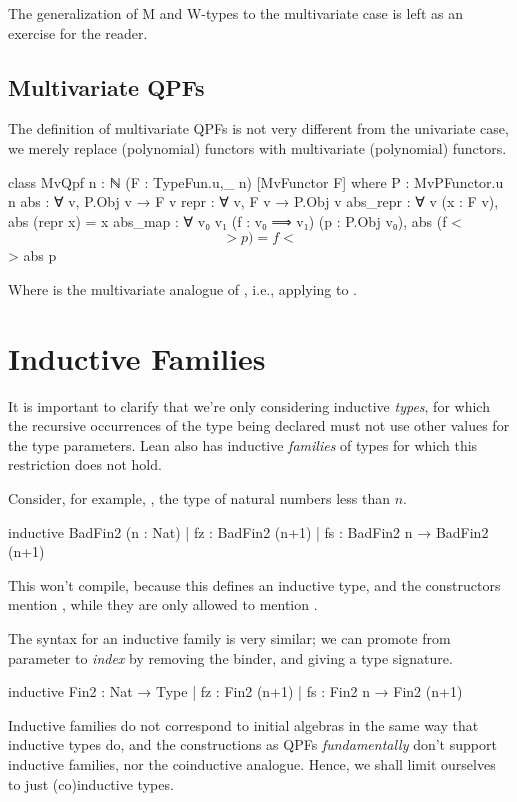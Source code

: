 The generalization of M and W-types to the multivariate case is left as an exercise for the reader.

\subsection*{Multivariate QPFs}
The definition of multivariate QPFs is not very different from the univariate case, we merely replace
(polynomial) functors with multivariate (polynomial) functors.

\begin{leancode}
  class MvQpf {n : ℕ} (F : TypeFun.{u,_} n) [MvFunctor F]  where
    P         : MvPFunctor.{u} n
    abs       : ∀ {v}, P.Obj v → F v
    repr      : ∀ {v}, F v → P.Obj v
    abs_repr  : ∀ {v} (x : F v), abs (repr x) = x
    abs_map   : ∀ {v₀ v₁} (f : v₀ ⟹ v₁) (p : P.Obj v₀), 
                    abs (f <$$> p) = f <$$> abs p
\end{leancode}

Where  is the multivariate analogue of , i.e., applying 
 to .


\section{Inductive Families}
\label{sec:ind_families}

It is important to clarify that we're only considering inductive \emph{types}, 
for which the recursive occurrences of the type being declared must not use other values for the type parameters. Lean also has inductive \emph{families} of types for which this restriction does not hold.

Consider, for example, , the type of natural numbers less than $n$.
\begin{badleancode}
    inductive BadFin2 (n : Nat)
    | fz : BadFin2 (n+1)
    | fs : BadFin2 n → BadFin2 (n+1)
\end{badleancode}

This won't compile, because this defines an inductive type, and the constructors mention , while they are only allowed to mention .

The syntax for an inductive family is very similar; we can promote  from parameter to \emph{index} by removing the binder, and giving a type signature.

\begin{leancode}
    inductive Fin2 : Nat → Type
    | fz : Fin2 (n+1)
    | fs : Fin2 n → Fin2 (n+1)
\end{leancode}

Inductive families do not correspond to initial algebras in the same way that inductive types do, and the constructions as QPFs \emph{fundamentally} don't support inductive families, nor the coinductive analogue.
Hence, we shall limit ourselves to just (co)inductive types.
